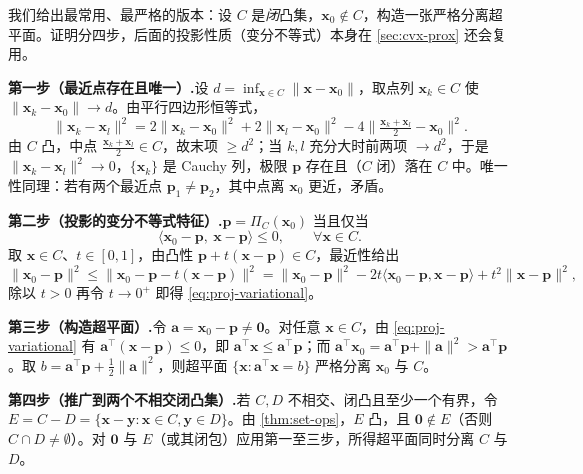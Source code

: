 \begin{derivation}
我们给出最常用、最严格的版本：设 $C$ 是\emph{闭}凸集，$\mathbf x_0\notin C$，构造一张严格分离超平面。证明分四步，后面的投影性质（变分不等式）本身在 \cref{sec:cvx-prox} 还会复用。

\textbf{第一步（最近点存在且唯一）.}\;设 $d=\inf_{\mathbf x\in C}\|\mathbf x-\mathbf x_0\|$，取点列 $\mathbf x_k\in C$ 使 $\|\mathbf x_k-\mathbf x_0\|\to d$。由平行四边形恒等式，
\[
  \|\mathbf x_k-\mathbf x_l\|^2=2\|\mathbf x_k-\mathbf x_0\|^2+2\|\mathbf x_l-\mathbf x_0\|^2-4\Big\|\tfrac{\mathbf x_k+\mathbf x_l}{2}-\mathbf x_0\Big\|^2.
\]
由 $C$ 凸，中点 $\tfrac{\mathbf x_k+\mathbf x_l}{2}\in C$，故末项 $\ge d^2$；当 $k,l$ 充分大时前两项 $\to d^2$，于是 $\|\mathbf x_k-\mathbf x_l\|^2\to0$，$\{\mathbf x_k\}$ 是 Cauchy 列，极限 $\mathbf p$ 存在且（$C$ 闭）落在 $C$ 中。唯一性同理：若有两个最近点 $\mathbf p_1\neq\mathbf p_2$，其中点离 $\mathbf x_0$ 更近，矛盾。

\textbf{第二步（投影的变分不等式特征）.}\;$\mathbf p=\Pi_C(\mathbf x_0)$ 当且仅当
\begin{equation}
  \langle\mathbf x_0-\mathbf p,\ \mathbf x-\mathbf p\rangle\le0,\qquad\forall\mathbf x\in C.
  \label{eq:proj-variational}
\end{equation}
取 $\mathbf x\in C$、$t\in[0,1]$，由凸性 $\mathbf p+t(\mathbf x-\mathbf p)\in C$，最近性给出
\[
  \|\mathbf x_0-\mathbf p\|^2\le\|\mathbf x_0-\mathbf p-t(\mathbf x-\mathbf p)\|^2=\|\mathbf x_0-\mathbf p\|^2-2t\langle\mathbf x_0-\mathbf p,\mathbf x-\mathbf p\rangle+t^2\|\mathbf x-\mathbf p\|^2,
\]
除以 $t>0$ 再令 $t\to0^+$ 即得 \cref{eq:proj-variational}。

\textbf{第三步（构造超平面）.}\;令 $\mathbf a=\mathbf x_0-\mathbf p\neq\mathbf 0$。对任意 $\mathbf x\in C$，由 \cref{eq:proj-variational} 有 $\mathbf a^\top(\mathbf x-\mathbf p)\le0$，即 $\mathbf a^\top\mathbf x\le\mathbf a^\top\mathbf p$；而 $\mathbf a^\top\mathbf x_0=\mathbf a^\top\mathbf p+\|\mathbf a\|^2>\mathbf a^\top\mathbf p$。取 $b=\mathbf a^\top\mathbf p+\tfrac12\|\mathbf a\|^2$，则超平面 $\{\mathbf x:\mathbf a^\top\mathbf x=b\}$ 严格分离 $\mathbf x_0$ 与 $C$。

\textbf{第四步（推广到两个不相交闭凸集）.}\;若 $C,D$ 不相交、闭凸且至少一个有界，令 $E=C-D=\{\mathbf x-\mathbf y:\mathbf x\in C,\mathbf y\in D\}$。由 \cref{thm:set-ops}，$E$ 凸，且 $\mathbf 0\notin E$（否则 $C\cap D\neq\emptyset$）。对 $\mathbf 0$ 与 $E$（或其闭包）应用第一至三步，所得超平面同时分离 $C$ 与 $D$。
\end{derivation}

